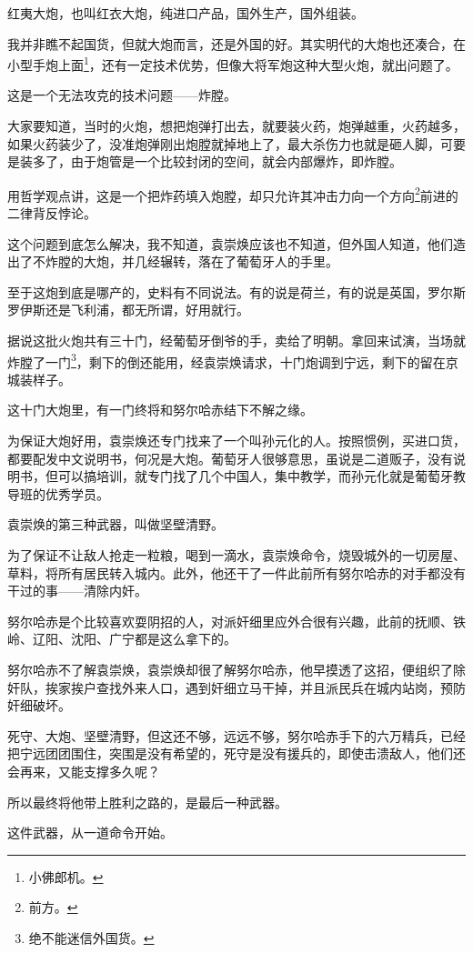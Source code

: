 \begin{multicols}{\theparacolNo}
红夷大炮，也叫红衣大炮，纯进口产品，国外生产，国外组装。

我并非瞧不起国货，但就大炮而言，还是外国的好。其实明代的大炮也还凑合，在小型手炮上面\footnote{小佛郎机。}，还有一定技术优势，但像大将军炮这种大型火炮，就出问题了。

这是一个无法攻克的技术问题——炸膛。

大家要知道，当时的火炮，想把炮弹打出去，就要装火药，炮弹越重，火药越多，如果火药装少了，没准炮弹刚出炮膛就掉地上了，最大杀伤力也就是砸人脚，可要是装多了，由于炮管是一个比较封闭的空间，就会内部爆炸，即炸膛。

用哲学观点讲，这是一个把炸药填入炮膛，却只允许其冲击力向一个方向\footnote{前方。}前进的二律背反悖论。

这个问题到底怎么解决，我不知道，袁崇焕应该也不知道，但外国人知道，他们造出了不炸膛的大炮，并几经辗转，落在了葡萄牙人的手里。

至于这炮到底是哪产的，史料有不同说法。有的说是荷兰，有的说是英国，罗尔斯罗伊斯还是飞利浦，都无所谓，好用就行。

据说这批火炮共有三十门，经葡萄牙倒爷的手，卖给了明朝。拿回来试演，当场就炸膛了一门\footnote{绝不能迷信外国货。}，剩下的倒还能用，经袁崇焕请求，十门炮调到宁远，剩下的留在京城装样子。

这十门大炮里，有一门终将和努尔哈赤结下不解之缘。

为保证大炮好用，袁崇焕还专门找来了一个叫孙元化的人。按照惯例，买进口货，都要配发中文说明书，何况是大炮。葡萄牙人很够意思，虽说是二道贩子，没有说明书，但可以搞培训，就专门找了几个中国人，集中教学，而孙元化就是葡萄牙教导班的优秀学员。

袁崇焕的第三种武器，叫做坚壁清野。

为了保证不让敌人抢走一粒粮，喝到一滴水，袁崇焕命令，烧毁城外的一切房屋、草料，将所有居民转入城内。此外，他还干了一件此前所有努尔哈赤的对手都没有干过的事——清除内奸。

努尔哈赤是个比较喜欢耍阴招的人，对派奸细里应外合很有兴趣，此前的抚顺、铁岭、辽阳、沈阳、广宁都是这么拿下的。

努尔哈赤不了解袁崇焕，袁崇焕却很了解努尔哈赤，他早摸透了这招，便组织了除奸队，挨家挨户查找外来人口，遇到奸细立马干掉，并且派民兵在城内站岗，预防奸细破坏。

死守、大炮、坚壁清野，但这还不够，远远不够，努尔哈赤手下的六万精兵，已经把宁远团团围住，突围是没有希望的，死守是没有援兵的，即使击溃敌人，他们还会再来，又能支撑多久呢？

所以最终将他带上胜利之路的，是最后一种武器。

这件武器，从一道命令开始。


\end{multicols}
